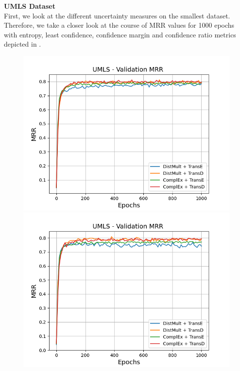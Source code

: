 \textbf{UMLS Dataset}
\label{subsubsec:metrics_umls}\\
%
First, we look at the different uncertainty measures on the smallest \umls dataset.
Therefore, we take a closer look at the course of MRR values for 1000 epochs with entropy, least confidence, confidence margin and confidence ratio metrics depicted in .
\begin{figure}[H]
    \centering
    \begin{minipage}{.5\textwidth}
      \centering
      \includegraphics[width=0.9\linewidth]{figures/results/gan_train/not_pretrained/uncertainty/max_distribution/entropy/umls/1k_epochs/uncertainty_umls_mrrs.png}
    \end{minipage}%
    \begin{minipage}{.5\textwidth}
      \centering
      \includegraphics[width=0.9\linewidth]{figures/results/gan_train/not_pretrained/uncertainty/max_distribution/least_confidence/umls/uncertainty_umls_mrrs.png}

\end{minipage}
\end{figure}

